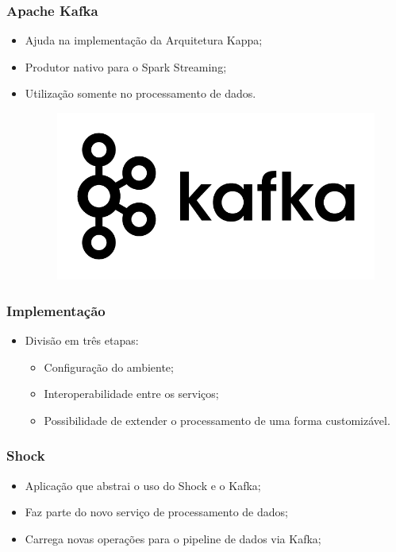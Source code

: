 \documentclass{beamer}
\begin{document}
  \begin{frame}
      \frametitle{Apache Kafka}
      \begin{itemize}
          \item Ajuda na implementação da Arquitetura Kappa;
          \item Produtor nativo para o Spark Streaming;
          \item Utilização somente no processamento de dados.
              \begin{figure}
                  \includegraphics[scale=0.3]{figures/kafka_logo.png}
              \end{figure}
      \end{itemize}
  \end{frame}

  \begin{frame}
      \frametitle{Implementação}
      \begin{itemize}
          \item Divisão em três etapas:
              \begin{itemize}
                  \item Configuração do ambiente;
                  \item Interoperabilidade entre os serviços;
                  \item Possibilidade de extender o processamento de uma forma customizável.
              \end{itemize}
      \end{itemize}
  \end{frame}

  \begin{frame}
      \frametitle{Shock}
      \begin{itemize}
          \item Aplicação que abstrai o uso do Shock e o Kafka;
          \item Faz parte do novo serviço de processamento de dados;
          \item Carrega novas operações para o pipeline de dados via Kafka;
      \end{itemize}
  \end{frame}
\end{document}
